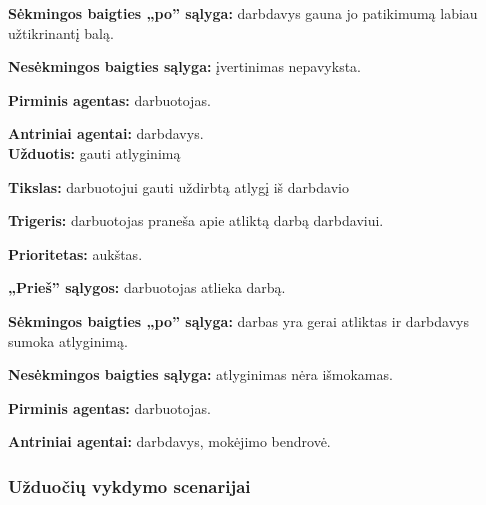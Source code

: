 \documentclass{VUMIFPSkursinis}
\begin{document}
\textbf{Sėkmingos baigties „po” sąlyga:} darbdavys gauna jo patikimumą labiau užtikrinantį balą.

\textbf{Nesėkmingos baigties sąlyga:} įvertinimas nepavyksta.

\textbf{Pirminis agentas:} darbuotojas.

\textbf{Antriniai agentai:} darbdavys.
\\

\textbf{Užduotis:} gauti atlyginimą

\textbf{Tikslas:} darbuotojui gauti uždirbtą atlygį iš darbdavio

\textbf{Trigeris:} darbuotojas praneša apie atliktą darbą darbdaviui.

\textbf{Prioritetas:} aukštas.

\textbf{„Prieš” sąlygos:} darbuotojas atlieka darbą.

\textbf{Sėkmingos baigties „po” sąlyga:} darbas yra gerai atliktas ir darbdavys sumoka atlyginimą.

\textbf{Nesėkmingos baigties sąlyga:} atlyginimas nėra išmokamas.

\textbf{Pirminis agentas:} darbuotojas.

\textbf{Antriniai agentai:} darbdavys, mokėjimo bendrovė.

\subsubsection{Užduočių vykdymo scenarijai}
\end{document}
